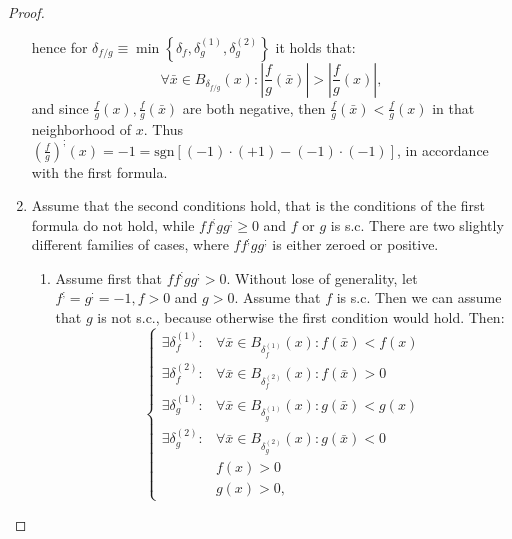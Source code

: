 \documentclass[11pt]{book}
\begin{document}
\begin{proof}
\begin{enumerate}
hence for $\delta_{f/g}\equiv\min\left\{ \delta_{f},\delta_{g}^{\left(1\right)},\delta_{g}^{\left(2\right)}\right\}$ it holds that: $$\forall\bar{x}\in B_{\delta_{f/g}}\left(x\right):\left|\frac{f}{g}\left(\bar{x}\right)\right|>\left|\frac{f}{g}\left(x\right)\right|,$$
and since $\frac{f}{g}\left(x\right),\frac{f}{g}\left(\bar{x}\right)$ are both negative, then $\frac{f}{g}\left(\bar{x}\right)<\frac{f}{g}\left(x\right)$ in that neighborhood of $x$. Thus $\left(\frac{f}{g}\right)^{;}\left(x\right)=-1=\text{sgn}\left[\left(-1\right)\cdot\left(+1\right)-\left(-1\right)\cdot\left(-1\right)\right]$, in accordance with the first formula.

\item Assume that the second conditions hold, that is the conditions of the first formula do not hold, while $ff^{;}gg^{;}\geq0$ and $f$ or $g$ is s.c. There are two slightly different families of cases, where $ff^{;}gg^{;}$ is either zeroed or positive.

\begin{enumerate}
\item Assume first that $ff^{;}gg^{;}>0$. Without lose of generality, let $f^{;}=g^{;}=-1,f>0$ and $g>0$. Assume that $f$ is s.c. Then we can assume that $g$ is not s.c., because otherwise the first condition would hold. Then:
$$\begin{cases}\exists\delta_{f}^{\left(1\right)}: & \forall\bar{x}\in B_{\delta_{f}^{\left(1\right)}}\left(x\right):f\left(\bar{x}\right)< f\left(x\right)\\ \exists\delta_{f}^{\left(2\right)}: & \forall\bar{x}\in B_{\delta_{f}^{\left(2\right)}}\left(x\right):f\left(\bar{x}\right)>0\\\exists\delta_{g}^{\left(1\right)}: & \forall\bar{x}\in B_{\delta_{g}^{\left(1\right)}}\left(x\right):g\left(\bar{x}\right)< g\left(x\right)\\\exists\delta_{g}^{\left(2\right)}: & \forall\bar{x}\in B_{\delta_{g}^{\left(2\right)}}\left(x\right):g\left(\bar{x}\right)<0\\ & f\left(x\right)>0\\& g\left(x\right)>0,\end{cases}$$


\end{enumerate}
\end{enumerate}
\end{proof}
\end{document}
